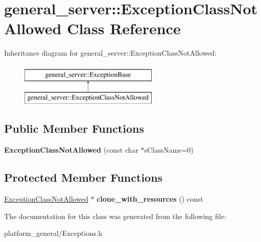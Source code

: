 \hypertarget{classgeneral__server_1_1ExceptionClassNotAllowed}{\section{general\-\_\-server\-:\-:\-Exception\-Class\-Not\-Allowed \-Class \-Reference}
\label{classgeneral__server_1_1ExceptionClassNotAllowed}
}
\-Inheritance diagram for general\-\_\-server\-:\-:\-Exception\-Class\-Not\-Allowed\-:\begin{figure}[H]
\begin{center}
\leavevmode
\includegraphics[height=2.000000cm]{classgeneral__server_1_1ExceptionClassNotAllowed}
\end{center}
\end{figure}
\subsection*{\-Public \-Member \-Functions}
\begin{DoxyCompactItemize}
\item 
\hypertarget{classgeneral__server_1_1ExceptionClassNotAllowed_a1e92cce1d46f52269c5d8f5bd006321f}{{\bfseries \-Exception\-Class\-Not\-Allowed} (const char $\ast$s\-Class\-Name=0)}\label{classgeneral__server_1_1ExceptionClassNotAllowed_a1e92cce1d46f52269c5d8f5bd006321f}

\end{DoxyCompactItemize}
\subsection*{\-Protected \-Member \-Functions}
\begin{DoxyCompactItemize}
\item 
\hypertarget{classgeneral__server_1_1ExceptionClassNotAllowed_a58e80a37ff4bdffcb9fe7ba046d42c83}{\hyperlink{classgeneral__server_1_1ExceptionClassNotAllowed}{\-Exception\-Class\-Not\-Allowed} $\ast$ {\bfseries clone\-\_\-with\-\_\-resources} () const }\label{classgeneral__server_1_1ExceptionClassNotAllowed_a58e80a37ff4bdffcb9fe7ba046d42c83}

\end{DoxyCompactItemize}


\-The documentation for this class was generated from the following file\-:\begin{DoxyCompactItemize}
\item 
platform\-\_\-general/\-Exceptions.\-h\end{DoxyCompactItemize}
